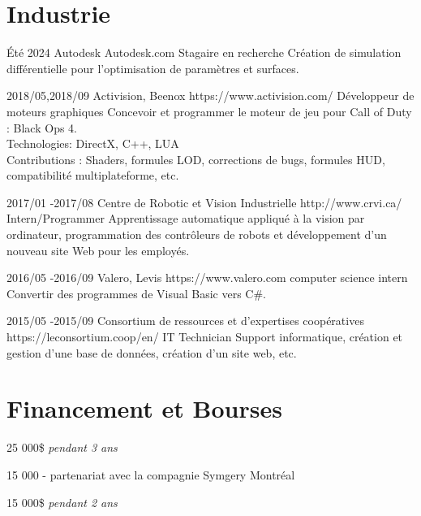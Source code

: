 \documentclass[10pt]{article} %
\begin{document}
\section{Industrie}

\job
{}{Été 2024}
{Autodesk}
{Autodesk.com}
{Stagaire en recherche}
{Création de simulation différentielle pour l'optimisation de paramètres et surfaces.}


\job
{2018/05,}{2018/09}
{Activision, Beenox}
{https://www.activision.com/}
{Développeur de moteurs graphiques}
{Concevoir et programmer le moteur de jeu pour Call of Duty : Black Ops 4.\\
 Technologies: DirectX, C++, LUA \\
 Contributions : Shaders, formules LOD, corrections de bugs, formules HUD, compatibilité multiplateforme, etc.}


\job
{2017/01 -}{2017/08}
{Centre de Robotic et Vision Industrielle}
{http://www.crvi.ca/}
{Intern/Programmer}
{Apprentissage automatique appliqué à la vision par ordinateur, programmation des contrôleurs de robots et développement d'un nouveau
site Web pour les employés.}

\job
{2016/05 -}{2016/09}
{Valero, Levis}
{https://www.valero.com}
{computer science intern}
{Convertir des programmes de Visual Basic vers C\#.}

\job
{2015/05 -}{2015/09}
{Consortium de ressources et d'expertises coopératives}
{https://leconsortium.coop/en/}
{IT Technician}
{Support informatique, création et gestion d'une base de données, création d'un site web, etc.}


\section{Financement et Bourses}

{
 25 000\$  \textit{pendant 3 ans}\\
}

{
 15 000 - partenariat avec la compagnie Symgery Montréal\\
}

{
 15 000\$ \textit{pendant 2 ans} \\
}
\end{document}
